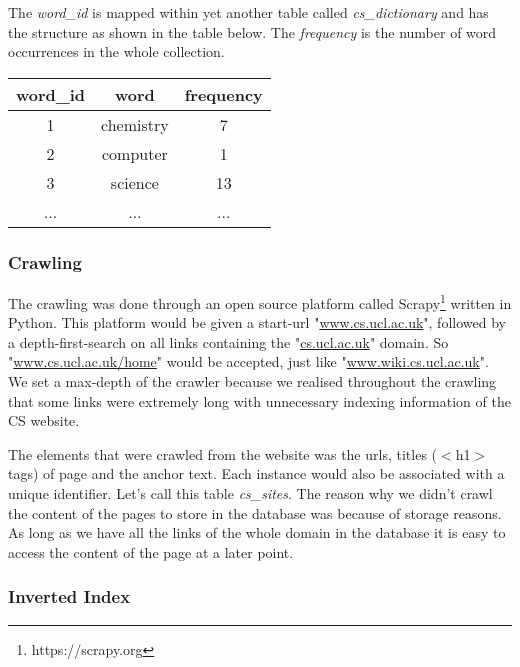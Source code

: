 The \emph{word\_id} is mapped within yet another table called \emph{cs\_dictionary} and has the structure as shown in the table below. The \emph{frequency} is the number of word occurrences in the whole collection.

\begin{table}[h!]
  \begin{tabular}{|c|c|c|}
  \hline
  word\_id & word & frequency \\ \hline 
  1 & chemistry & 7 \\\hline
  2 & computer & 1 \\\hline
  3 &science & 13 \\\hline
  ... & ... & ...
  \end{tabular}
\end{table}


\subsubsection{Crawling} %
\label{ssub:crawling}

The crawling was done through an open source platform called Scrapy\footnote{https://scrapy.org} written in Python. This platform would be given a start-url "\url{www.cs.ucl.ac.uk}", followed by a depth-first-search on all links containing the "\url{cs.ucl.ac.uk}" domain. So "\url{www.cs.ucl.ac.uk/home}" would be accepted, just like "\url{www.wiki.cs.ucl.ac.uk}". We set a max-depth of the crawler because we realised throughout the crawling that some links were extremely long with unnecessary indexing information of the CS website.

The elements that were crawled from the website was the urls, titles ($<$h1$>$ tags) of page and the anchor text. Each instance would also be associated with a unique identifier. Let's call this table \emph{cs\_sites}. The reason why we didn't crawl the content of the pages to store in the database was because of storage reasons. As long as we have all the links of the whole domain in the database it is easy to access the content of the page at a later point.


\subsubsection{Inverted Index} %
\label{ssub:inverted_index}

